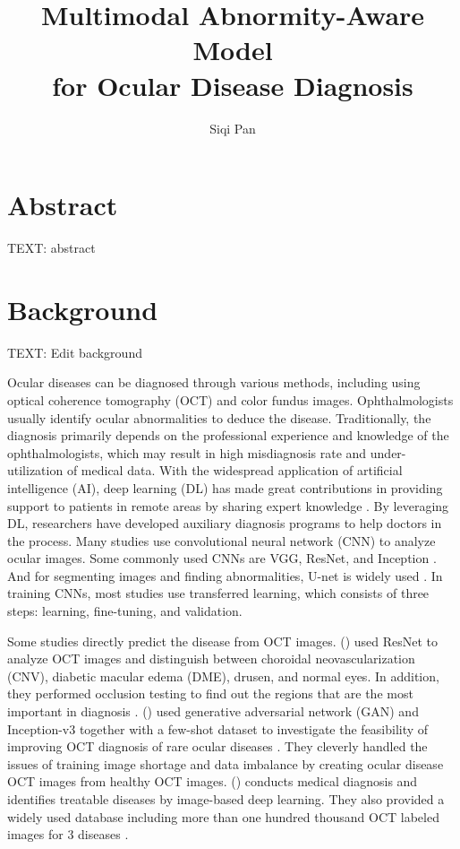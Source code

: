 \documentclass{article}
\newcommand{\authyear}[1]{\citeauthor{#1} (\citeyear{#1})}
\begin{document}
	\title{\vspace{-2.25cm} Multimodal Abnormity-Aware Model\\for Ocular Disease Diagnosis}
	\author{Siqi Pan}
	\date{}
	\maketitle
	
	\section*{Abstract}
	
	TEXT: abstract
	
	\pagebreak
	
	\section{Background}
		
		TEXT: Edit background
		
		Ocular diseases can be diagnosed through various methods, including using optical coherence tomography (OCT) and color fundus images. Ophthalmologists usually identify ocular abnormalities to deduce the disease.  Traditionally, the diagnosis primarily depends on the professional experience and knowledge of the ophthalmologists, which may result in high misdiagnosis rate and under-utilization of medical data.  With the widespread application of artificial intelligence (AI), deep learning (DL) has made great contributions in providing support to patients in remote areas by sharing expert knowledge \autocite{Ichhpujani_Thakur_2021}.  By leveraging DL, researchers have developed auxiliary diagnosis programs to help doctors in the process. Many studies use convolutional neural network (CNN) to analyze ocular images. Some commonly used CNNs are VGG, ResNet, and Inception \autocite{daich2023artificial}.  And for segmenting images and finding abnormalities, U-net is widely used \autocite{Ronneberger_Fischer_Brox_2015}. In training CNNs, most studies use transferred learning, which consists of three steps: learning, fine-tuning, and validation.
		
		Some studies directly predict the disease from OCT images.
		\authyear{li2019deep} used ResNet to analyze OCT images and distinguish between choroidal neovascularization (CNV), diabetic macular edema (DME), drusen, and normal eyes. In addition, they performed occlusion testing to find out the regions that are the most important in diagnosis \autocite{li2019deep}. 
		\authyear{yoo2021feasibility} used generative adversarial network (GAN) and Inception-v3 together with a few-shot dataset to investigate the feasibility of improving OCT diagnosis of rare ocular diseases \autocite{yoo2021feasibility}.  They cleverly handled the issues of training image shortage and data imbalance by creating ocular disease OCT images from healthy OCT images. \authyear{Kermany2018} conducts medical diagnosis and identifies treatable diseases by image-based deep learning.  They also provided a widely used database including more than one hundred thousand OCT labeled images for 3 diseases \autocite{Kermany2018}.
		
\end{document}
